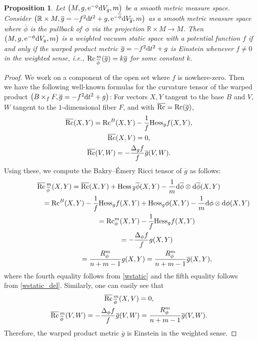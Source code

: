 \documentclass[10pt,a4paper]{amsart}
\numberwithin{equation}{section}
\newtheorem{Proposition}[Theorem]{Proposition}
 { \theoremstyle{definition}
\newtheorem{Definition}[Theorem]{Definition}
\newtheorem{Note}[Theorem]{Note}
\newtheorem{Example}[Theorem]{Example}
\newtheorem{Remark}[Theorem]{Remark} }
\begin{document}
\begin{Proposition}
 Let $\bigl(M,g,{\rm e}^{-\phi}{\rm d}V_g,m\bigr)$ be a smooth metric measure space.
 Consider $\bigl(\mathbb{R}\times M,\allowbreak \overline{g}=-f^2{\rm d}t^2+g,{\rm e}^{-\overline{\phi}}{\rm d}V_{\overline{g}},m\bigr)$ as a smooth metric measure space where $\overline{\phi}$ is the pullback of~$\phi$ via the projection $\mathbb{R}\times M\to M$. Then $\bigl(M,g,{\rm e}^{-\phi}{\rm d}V_g,m\bigr)$ is a weighted vacuum static space with a potential function $f$ if and only if the warped product metric $\overline{g}=-f^2{\rm d}t^2+g$ is Einstein whenever $f\neq0$ in the weighted sense, i.e., ${\rm Rc}\,_{\overline{\phi}}^m(\overline{g})=k\overline{g}$ for some constant $k$.
\end{Proposition}
\begin{proof}
 We work on a component of the open set where $f$ is nowhere-zero. Then
 we have the following well-known formulas for the curvature tensor of the warped product $\bigl(B\times_f F,\overline{g}=-f^2{\rm d}t^2+g\bigr)$:
 For vectors $X,Y$ tangent to the base $B$ and $V$, $W$ tangent to the $1$-dimensional fiber $F$, and with ${\rm \overline{Rc}}={\rm Rc}(\overline{g})$,
 \begin{gather*}
 {\rm \overline{Rc}}(X,Y)={\rm Rc}^B(X,Y)-\frac{1}{f}{\rm Hess}_gf(X,Y),\\
 {\rm \overline{Rc}}(X,V)=0,\\
 {\rm \overline{Rc}}(V,W)=-\frac{\Delta_gf}{f}\overline{g}(V,W).
 \end{gather*}
 Using these, we compute the Bakry--\'{E}mery Ricci tensor of $\overline{g}$ as follows:
 \begin{gather*}
 {\rm \overline{Rc}}\,_{\overline{\phi}}^m(X,Y)={\rm \overline{Rc}}(X,Y)+{\rm Hess}\,_{\overline{g}}\overline{\phi}(X,Y)-\frac{1}{m}{\rm d}\overline{\phi}\otimes {\rm d}\overline{\phi}(X,Y)\\
 \hphantom{{\rm \overline{Rc}}\,_{\overline{\phi}}^m(X,Y)}={\rm Rc}^B(X,Y)-\frac{1}{f}{\rm Hess}_gf(X,Y)+{\rm Hess}_{g}\phi(X,Y)-\frac{1}{m}{\rm d}\phi\otimes {\rm d}\phi(X,Y)\\
 \hphantom{{\rm \overline{Rc}}\,_{\overline{\phi}}^m(X,Y)}={\rm Rc}_\phi^m(X,Y)-\frac{1}{f}{\rm Hess}_gf(X,Y)\\
 \hphantom{{\rm \overline{Rc}}\,_{\overline{\phi}}^m(X,Y)}=-\frac{\Delta_\phi f}{f}g(X,Y)\\
 \hphantom{ {\rm \overline{Rc}}\,_{\overline{\phi}}^m(X,Y)}=\frac{R_\phi^m}{n+m-1}g(X,Y)=\frac{R_\phi^m}{n+m-1}\overline{g}(X,Y),
 \end{gather*}
 where the fourth equality follows from \eqref{wstatic} and the fifth equality follows from \eqref{wstatic_del}.
Similarly, one can easily see that
\begin{gather*}
 {\rm \overline{Rc}}\,_{\overline{\phi}}^m(X,V)=0,\\
 {\rm \overline{Rc}}\,_{\overline{\phi}}^m(V,W)=-\frac{\Delta_\phi f}{f}\overline{g}(V,W)=\frac{R_\phi^m}{n+m-1}\overline{g}(V,W).
\end{gather*}
Therefore, the warped product metric $\overline{g}$ is Einstein in the weighted sense.


\end{proof}
\end{document}
